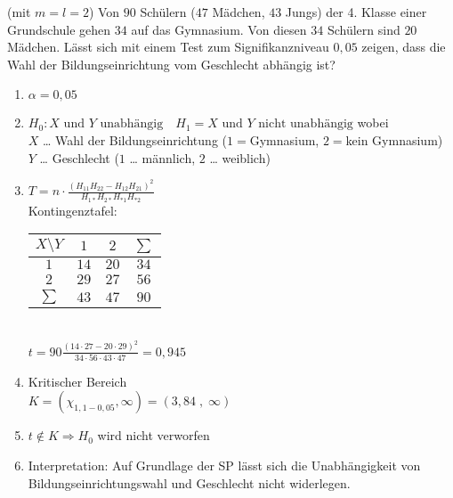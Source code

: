  (mit $m=l=2$) Von $90$ Schülern ($47$ Mädchen, $43$ Jungs) der 4. Klasse einer Grundschule gehen $34$ auf das Gymnasium. Von diesen $34$ Schülern sind $20$ Mädchen. Lässt sich mit einem Test zum Signifikanzniveau $0,05$ zeigen, dass die Wahl der Bildungseinrichtung vom Geschlecht abhängig ist?
\begin{enumerate}
\item $\alpha = 0,05$
\item $H_0: X\text{ und }Y\text{ unabhängig} \quad H_1=X \text{ und }Y \text{ nicht unabhängig}$ wobei \\
$X$ … Wahl der Bildungseinrichtung ($1=$Gymnasium, $2=$kein Gymnasium)\\
$Y$ … Geschlecht ($1$ … männlich, $2$ … weiblich)
\item $T=n\cdot \frac{(H_{11} H_{22}-H_{12}H_{21})^2}{H_{1*}H_{2*}H_{*1}H_{*2}}$\\
Kontingenztafel:\\
\begin{tabular}{c | c c | c}
$X\setminus Y$ & $1$ & $2$ & $\sum$\\\hline
$1$ & $14$ & $20$ & $34$\\
$2$ & $29$ & $27$ & $56$\\\hline
$\sum$& $43$ & $47$ & $90$
\end{tabular}\\
$t=90\frac{(14\cdot 27-20 \cdot 29)^2}{34\cdot 56 \cdot 43 \cdot 47}=0,945$
\item Kritischer Bereich\\
$K=(\chi_{1, 1-0,05}, \infty) = (3,84\;,\; \infty)$
\item $t\not \in K \Rightarrow H_0$ wird nicht verworfen
\item Interpretation: Auf Grundlage der SP lässt sich die Unabhängigkeit von Bildungseinrichtungswahl und Geschlecht nicht widerlegen.
\end{enumerate}

